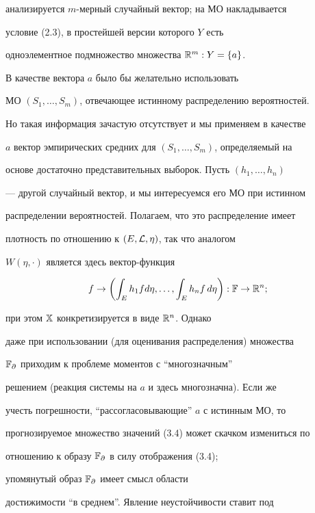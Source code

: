 анализируется $m$-мерный случайный вектор; на МО накладывается


условие (2.3), в простейшей версии которого $Y$ есть


одноэлементное подмножество множества ${\Bbb R}^m: Y = \{a\}$.


В качестве вектора $a$ было бы желательно использовать


МО $(S_1,\dotsc,S_m)$, отвечающее истинному распределению вероятностей.


Но такая информация зачастую отсутствует и мы применяем в качестве


$a$ вектор эмпирических средних для $(S_1,\dotsc,S_m)$, определяемый на


основе достаточно представительных выборок. Пусть $(h_1,\dotsc,h_n)$


--- другой случайный вектор, и мы интересуемся его МО при истинном


распределении вероятностей. Полагаем, что это распределение имеет


плотность по отношению к $(E, {\cal L}, \eta)$, так что аналогом


$W(\eta, \cdot)$ является здесь вектор-функция


%


\begin{equation}


f \to \biggl(\int_E h_1fd\eta,\dotsc,\int_E h_n f\,d\eta\biggr): 


{\Bbb F} \to {\Bbb R}^n;


\end{equation}


%


при этом ${\Bbb X}$ конкретизируется в виде ${\Bbb R}^n$. Однако


даже при использовании (для оценивания распределения) множества


${\Bbb F}_\partial$ приходим к проблеме моментов с ``многозначным''


решением (реакция системы на $a$ и здесь многозначна). Если же


учесть погрешности, ``рассогласовывающие'' $a$ с истинным МО, то


прогнозируемое множество значений (3.4) может скачком измениться по


отношению к образу ${\Bbb F}_\partial$ в силу отображения (3.4);


упомянутый образ ${\Bbb F}_\partial$ имеет смысл области


достижимости ``в среднем''. Явление неустойчивости ставит под


